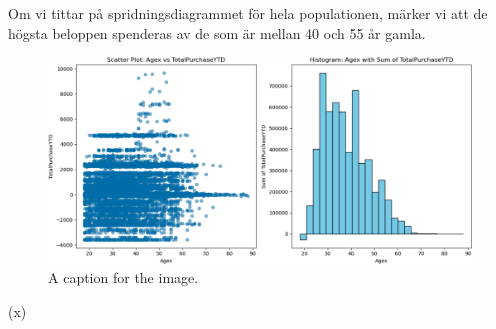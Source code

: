 \documentclass[]{article}
\begin{document}
Om vi tittar på spridningsdiagrammet för hela populationen, märker vi att de högsta beloppen spenderas av de som är mellan 40 och 55 år gamla.
\begin{figure}[h]
    \centering
    \includegraphics[width=\textwidth]{img_total_purchase_ytd_agex.png}
    \caption{A caption for the image.}
\end{figure}
\if(x)
\\\\\\\\\\\\\\\\\\\\\\\\\\\\\\\\\\\\\\\\\\\\
\end{document}
